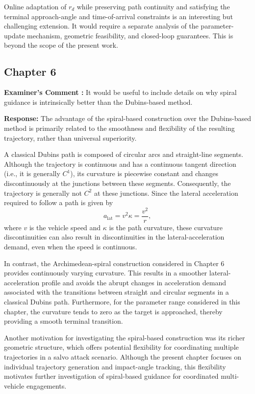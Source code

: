 \documentclass[11pt,a4paper]{article}
\newcounter{examcomment}
\renewcommand{\theexamcomment}{\arabic{examcomment}}
\newcommand{\comment}[1]{%
\refstepcounter{examcomment}%
\par\vspace{5pt}\noindent
\colorbox{gray!13}{%
	\parbox{\dimexpr\linewidth-2\fboxsep}{%
		\textbf{Examiner's Comment \theexamcomment:} #1%
	}%
}%
\par
}
\newcommand{\response}{\par\textbf{Response:} }
\newcommand{\revision}{\par\textbf{Proposed thesis revision:} }
\begin{document}
Online adaptation of $r_d$ while preserving path continuity and
satisfying the terminal approach-angle and time-of-arrival
constraints is an interesting but challenging extension. It would
require a separate analysis of the parameter-update mechanism,
geometric feasibility, and closed-loop guarantees. This is beyond
the scope of the present work.


\subsection*{Chapter 6}

\comment{It would be useful to include details on why spiral guidance is intrinsically better than the Dubins-based method.}
\response
The advantage of the spiral-based construction over the Dubins-based
method is primarily related to the smoothness and flexibility of the
resulting trajectory, rather than universal superiority.

A classical Dubins path is composed of circular arcs and straight-line
segments. Although the trajectory is continuous and has a continuous
tangent direction (i.e., it is generally $C^1$), its curvature is
piecewise constant and changes discontinuously at the junctions
between these segments. Consequently, the trajectory is generally
not $C^2$ at these junctions. Since the lateral acceleration required
to follow a path is given by
\[
a_{\mathrm{lat}}=v^2\kappa=\frac{v^2}{r},
\]
where $v$ is the vehicle speed and $\kappa$ is the path curvature,
these curvature discontinuities can also result in discontinuities
in the lateral-acceleration demand, even when the speed is continuous.

In contrast, the Archimedean-spiral construction considered in
Chapter 6 provides continuously varying curvature. This results
in a smoother lateral-acceleration profile and avoids the abrupt
changes in acceleration demand associated with the transitions
between straight and circular segments in a classical Dubins path.
Furthermore, for the parameter range considered in this chapter,
the curvature tends to zero as the target is approached, thereby
providing a smooth terminal transition.

Another motivation for investigating the spiral-based construction
was its richer geometric structure, which offers potential flexibility
for coordinating multiple trajectories in a salvo attack scenario.
Although the present chapter focuses on individual trajectory
generation and impact-angle tracking, this flexibility motivates
further investigation of spiral-based guidance for coordinated
multi-vehicle engagements.
\end{document}
